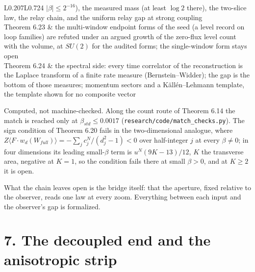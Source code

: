 \documentclass[10pt,letterpaper,twocolumn]{article}
\providecommand{\rm}{}\DeclareOldFontCommand{\rm}{\normalfont\rmfamily}{\mathrm}
\begin{document}
\begin{center}
{\begin{xtabular}{L{0.207\linewidth}L{0.724\linewidth}}
\(\lvert\beta\rvert\le2^{-16}\)), the measured mass (at least \(\log2\)
there), the two-slice law, the relay chain, and the uniform relay gap at
strong coupling \\
Theorem 6.23 & the multi-window endpoint forms of the seed (a level record on loop
families) are refuted under an argued growth of the zero-flux level
count with the volume, at \(SU(2)\) for the audited forms; the
single-window form stays open \\
Theorem 6.24 & the spectral side: every time correlator of the reconstruction is the
Laplace transform of a finite rate measure (Bernstein--Widder); the gap
is the bottom of those measures; momentum sectors and a Källén--Lehmann
template, the template shown for no composite vector \\
\end{xtabular}
}
\end{center}

Computed, not machine-checked. Along the count route of Theorem 6.14 the match is reached only at \(\beta_{\rm std}\le0.0017\) (\texttt{research/\allowbreak{}code/\allowbreak{}match\_\allowbreak{}checks.\allowbreak{}py}). The sign condition of Theorem 6.20 fails in the two-dimensional analogue, where \(Z\langle F\cdot w_d(W_{\rm full})\rangle=-\sum_jc_j^N/(d_j^2-1)<0\) over half-integer \(j\) at every \(\beta\ne0\); in four dimensions its leading small-\(\beta\) term is \(u^N(9K-13)/12\), \(K\) the transverse area, negative at \(K=1\), so the condition fails there at small \(\beta>0\), and at \(K\ge2\) it is open.

What the chain leaves open is the bridge itself: that the aperture, fixed relative to the observer, reads one law at every zoom. Everything between each input and the observer's gap is formalized.

\section{7. The decoupled end and the anisotropic strip}\label{7-the-decoupled-end-and-the-anisotropic-strip}
\end{document}
